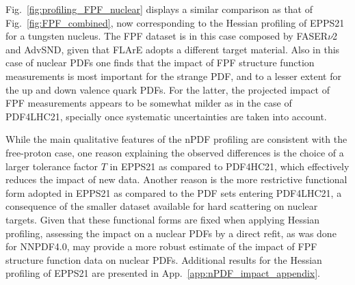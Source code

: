 Fig.~\ref{fig:profiling_FPF_nuclear} displays a similar comparison as that of
 Fig.~\ref{fig:FPF_combined}, now corresponding to the Hessian
 profiling of EPPS21 for a tungsten nucleus.
 The FPF dataset is in this case composed by FASER$\nu$2 and AdvSND, given that FLArE
 adopts a different target material.
 Also in this case of nuclear PDFs one finds that the impact of FPF structure function measurements
 is most important for the strange PDF, and to a lesser extent for the up and down
 valence quark PDFs.
 For the latter, the projected impact of FPF measurements appears to be somewhat milder
 as in the case of PDF4LHC21, specially once systematic uncertainties are taken into account.

 While the main qualitative features of the nPDF profiling are consistent with the free-proton
 case, one reason explaining the observed differences is the choice of a larger tolerance factor $T$ in EPPS21
 as compared to PDF4HC21, which effectively reduces the impact of new data.
 Another reason is the more restrictive functional form adopted in EPPS21 as compared
 to the PDF sets entering PDF4LHC21, a consequence of the smaller dataset available
 for hard scattering on nuclear targets.
 Given that these  functional forms are fixed when applying Hessian profiling,
 assessing the impact on a nuclear PDFs by a direct refit, as was done for NNPDF4.0,
 may provide a more  robust estimate of the impact of FPF structure function data
 on nuclear PDFs.
 Additional results for the Hessian profiling of EPPS21 are presented in App.~\ref{app:nPDF_impact_appendix}.
